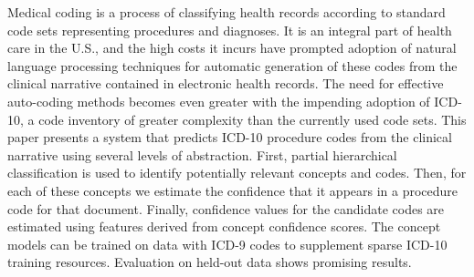 Medical coding is a process of classifying health records according to standard code sets representing procedures and diagnoses. It is an integral part of health care in the U.S., and the high costs it incurs have prompted adoption of natural language processing techniques for automatic generation of these codes from the clinical narrative contained in electronic health records. The need for effective auto-coding methods becomes even greater with the impending adoption of ICD-10, a code inventory of greater complexity than the currently used code sets. This paper presents a system that predicts ICD-10 procedure codes from the clinical narrative using several levels of abstraction. First, partial hierarchical classification is used to identify potentially relevant concepts and codes. Then, for each of these concepts we estimate the confidence that it appears in a procedure code for that document. Finally, confidence values for the candidate codes are estimated using features derived from concept confidence scores. The concept models can be trained on data with ICD-9 codes to supplement sparse ICD-10 training resources. Evaluation on held-out data shows promising results.
